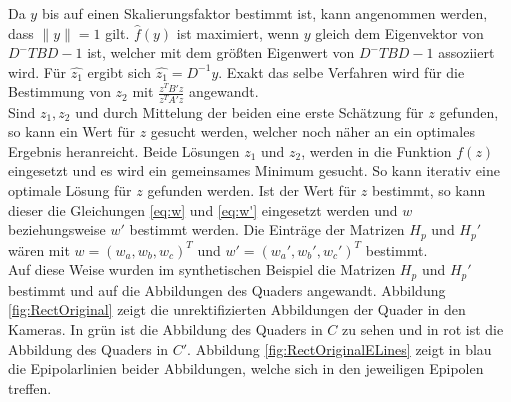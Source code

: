 Da $y$ bis auf einen Skalierungsfaktor bestimmt ist, kann angenommen werden, dass $\parallel y \parallel = 1$ gilt. $\hat{f}(y)$ ist maximiert, wenn $y$ gleich dem Eigenvektor von $D^-TBD-1$ ist, welcher mit dem größten Eigenwert von $D^-TBD-1$ assoziiert wird\cite{ZZ}. Für $\hat{z_1}$ ergibt sich $\hat{z_1} = D^{-1}y$. Exakt das selbe Verfahren wird für die Bestimmung von $z_2$ mit  $\frac{z^TB'z}{z^TA'z}$ angewandt\cite{ZZ}.\\


Sind $z_1, z_2$ und durch Mittelung der beiden eine erste Schätzung für $z$ gefunden, so kann ein Wert für $z$ gesucht werden, welcher noch näher an ein optimales Ergebnis heranreicht. Beide Lösungen $z_1$ und $z_2$, werden in die Funktion $f(z)$ eingesetzt und es wird ein gemeinsames Minimum gesucht\cite{ZZ}. So kann iterativ eine optimale Lösung für $z$ gefunden werden. Ist der Wert für $z$ bestimmt, so kann dieser die Gleichungen \ref{eq:w} und \ref{eq:w'} eingesetzt werden und $w$ beziehungsweise $w'$ bestimmt werden. Die Einträge der Matrizen $H_p$ und $H_p'$ wären mit $w = (w_a,w_b,w_c)^T$ und $w' = (w_a',w_b',w_c')^T$ bestimmt\cite{ZZ}.\\

Auf diese Weise wurden im synthetischen Beispiel die Matrizen $H_p$ und $H_p'$ bestimmt und auf die Abbildungen des Quaders angewandt. Abbildung \ref{fig:RectOriginal} zeigt die unrektifizierten Abbildungen der Quader in den Kameras. In grün ist die Abbildung des Quaders in $C$ zu sehen und in rot ist die Abbildung des Quaders in $C'$. Abbildung \ref{fig:RectOriginalELines} zeigt in blau die Epipolarlinien beider Abbildungen, welche sich in den jeweiligen Epipolen treffen. 



